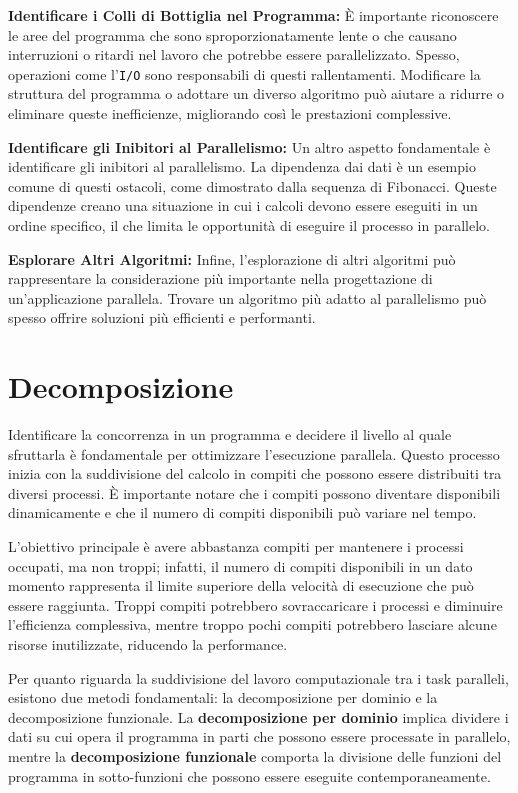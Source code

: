 \textbf{Identificare i Colli di Bottiglia nel Programma:}
È importante riconoscere le aree del programma che
sono sproporzionatamente lente o che causano interruzioni
o ritardi nel lavoro che potrebbe essere parallelizzato.
Spesso, operazioni come l'\texttt{I/O} sono responsabili di questi
rallentamenti. Modificare la struttura del programma
o adottare un diverso algoritmo può aiutare a ridurre
o eliminare queste inefficienze,
migliorando così le prestazioni complessive.

\textbf{Identificare gli Inibitori al Parallelismo:}
Un altro aspetto fondamentale è identificare gli inibitori
al parallelismo. La dipendenza dai dati è un esempio
comune di questi ostacoli, come dimostrato dalla sequenza
di Fibonacci. Queste dipendenze creano una situazione in
cui i calcoli devono essere eseguiti in un ordine
specifico, il che limita le opportunità di eseguire
il processo in parallelo.

\textbf{Esplorare Altri Algoritmi:} Infine,
l'esplorazione di altri algoritmi può rappresentare
la considerazione più importante nella progettazione
di un'applicazione parallela. Trovare un algoritmo più
adatto al parallelismo può spesso offrire soluzioni più
efficienti e performanti.

\section{Decomposizione}
Identificare la concorrenza in un programma
e decidere il livello al quale sfruttarla è
fondamentale per ottimizzare l'esecuzione parallela.
Questo processo inizia con la suddivisione del calcolo
in compiti che possono essere distribuiti tra diversi processi. È importante notare che i compiti possono diventare disponibili dinamicamente e che il numero di compiti disponibili può variare nel tempo.

L'obiettivo principale è avere abbastanza compiti per
mantenere i processi occupati, ma non troppi; infatti,
il numero di compiti disponibili in un dato momento
rappresenta il limite superiore della velocità di
esecuzione che può essere raggiunta. Troppi
compiti potrebbero sovraccaricare i processi
e diminuire l'efficienza complessiva, mentre
troppo pochi compiti potrebbero lasciare alcune
risorse inutilizzate, riducendo la performance.

Per quanto riguarda la suddivisione del lavoro
computazionale tra i task paralleli, esistono
due metodi fondamentali: la decomposizione per
dominio e la decomposizione funzionale. La
\textbf{decomposizione per dominio} implica
dividere i dati su cui opera il programma in parti
che possono essere processate in parallelo, mentre
la \textbf{decomposizione funzionale} comporta
la divisione delle funzioni del programma in sotto-funzioni
che possono essere eseguite contemporaneamente.

